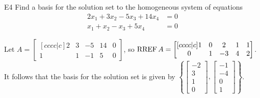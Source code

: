\documentclass{sbgLAquiz}
\begin{document}
\begin{extract}\newpage\end{extract}
\begin{problem}{E4}
Find a basis for the solution set to the homogeneous system of equations
\begin{align*}
2x_1+3x_2-5x_3+14x_4 &= 0\\
x_1+x_2-x_3+5x_4 &= 0
\end{align*}
\end{problem}
\begin{solution}
Let \(A =
  \begin{bmatrix}[cccc|c]
    2 & 3 & -5 & 14 & 0 \\
    1 & 1 & -1 & 5 & 0
  \end{bmatrix}
\), so \(\operatorname{RREF} A =
  \begin{bmatrix}[cccc|c]
    1 & 0 & 2 & 1 & 1 \\
    0 & 1 & -3 & 4 & 2 \\
  \end{bmatrix}
\).
It follows that the basis for the solution set is given by \(\left\{
  \begin{bmatrix}
    - 2 \\
    3 \\
    1 \\
    0
  \end{bmatrix},
  \begin{bmatrix}
    -1 \\
    - 4 \\
    0 \\
    1
  \end{bmatrix}
\right\}\).
\end{solution}
\end{document}
